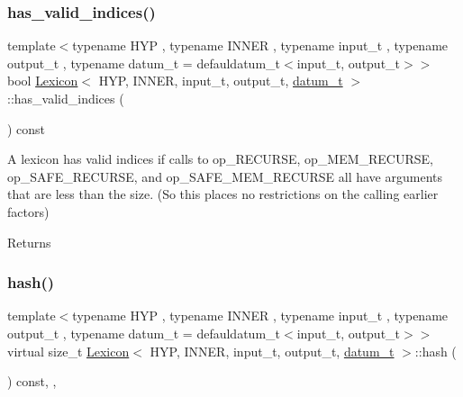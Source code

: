 \subsubsection{\texorpdfstring{has\+\_\+valid\+\_\+indices()}{has\_valid\_indices()}}
{\footnotesize\ttfamily template$<$typename H\+YP , typename I\+N\+N\+ER , typename input\+\_\+t , typename output\+\_\+t , typename datum\+\_\+t  = defauldatum\+\_\+t$<$input\+\_\+t, output\+\_\+t$>$$>$ \\
bool \hyperlink{class_lexicon}{Lexicon}$<$ H\+YP, I\+N\+N\+ER, input\+\_\+t, output\+\_\+t, \hyperlink{class_bayesable_a9f1a6c0cd7855550fa10b1a8f13a5867}{datum\+\_\+t} $>$\+::has\+\_\+valid\+\_\+indices (\begin{DoxyParamCaption}{ }\end{DoxyParamCaption}) const\hspace{0.3cm}{\ttfamily [inline]}}

A lexicon has valid indices if calls to op\+\_\+\+R\+E\+C\+U\+R\+SE, op\+\_\+\+M\+E\+M\+\_\+\+R\+E\+C\+U\+R\+SE, op\+\_\+\+S\+A\+F\+E\+\_\+\+R\+E\+C\+U\+R\+SE, and op\+\_\+\+S\+A\+F\+E\+\_\+\+M\+E\+M\+\_\+\+R\+E\+C\+U\+R\+SE all have arguments that are less than the size. (So this places no restrictions on the calling earlier factors) \begin{DoxyReturn}{Returns}

\end{DoxyReturn}
\mbox{\label{class_lexicon_afbefa510e623ee4a407a1e1e04f42fb2}} 
\subsubsection{\texorpdfstring{hash()}{hash()}}
{\footnotesize\ttfamily template$<$typename H\+YP , typename I\+N\+N\+ER , typename input\+\_\+t , typename output\+\_\+t , typename datum\+\_\+t  = defauldatum\+\_\+t$<$input\+\_\+t, output\+\_\+t$>$$>$ \\
virtual size\+\_\+t \hyperlink{class_lexicon}{Lexicon}$<$ H\+YP, I\+N\+N\+ER, input\+\_\+t, output\+\_\+t, \hyperlink{class_bayesable_a9f1a6c0cd7855550fa10b1a8f13a5867}{datum\+\_\+t} $>$\+::hash (\begin{DoxyParamCaption}{ }\end{DoxyParamCaption}) const\hspace{0.3cm}{\ttfamily [inline]}, {\ttfamily [override]}, {\ttfamily [virtual]}}



